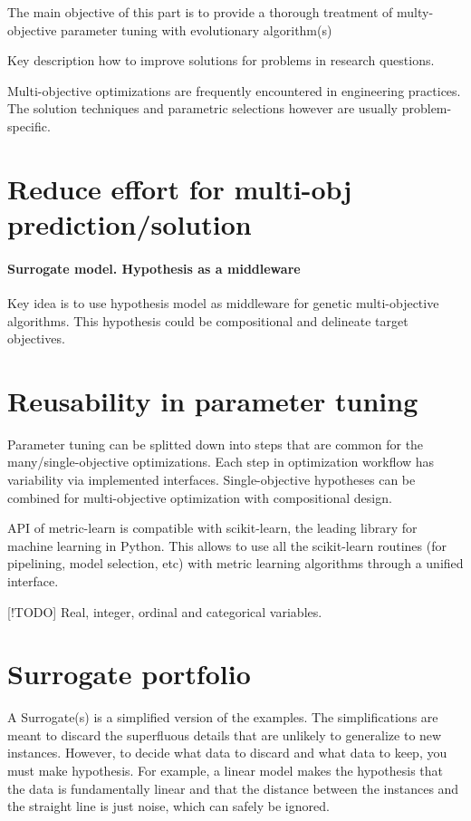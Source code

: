     The main objective of this part is to provide a thorough treatment of multy-objective parameter tuning with evolutionary algorithm(s)


    Key description how to improve solutions for problems in research questions.

    Multi-objective optimizations are frequently encountered in
    engineering practices. The solution techniques and parametric
    selections however are usually problem-specific. \cite{DBLP:journals/corr/abs-1812-07958}

    \section{Reduce effort for multi-obj prediction/solution}
        \paragraph{Surrogate model. Hypothesis as a middleware}
        Key idea is to use hypothesis model as middleware for genetic multi-objective algorithms.
        This hypothesis could be compositional and delineate target objectives. 

    \section{Reusability in parameter tuning}
        Parameter tuning can be splitted down into steps that are common for the many/single-objective optimizations. 
        Each step in optimization workflow has variability via implemented interfaces.
        Single-objective hypotheses can be combined for multi-objective optimization with compositional design.

        API of metric-learn is compatible with scikit-learn, the leading library for machine learning in Python. 
        This allows to use all the scikit-learn routines (for pipelining, model selection, etc) with metric learning algorithms through a unified interface.

        [!TODO] Real, integer, ordinal and categorical variables.

    \section{Surrogate portfolio}
        A Surrogate(s) is a simplified version of the examples. The simplifications are meant to discard the superfluous details that are unlikely to generalize to new instances. 
        However, to decide what data to discard and what data to keep, you must make hypothesis. 
        For example, a linear model makes the hypothesis that the data is fundamentally linear and that the distance between the instances and the straight line is just noise, 
        which can safely be ignored.

